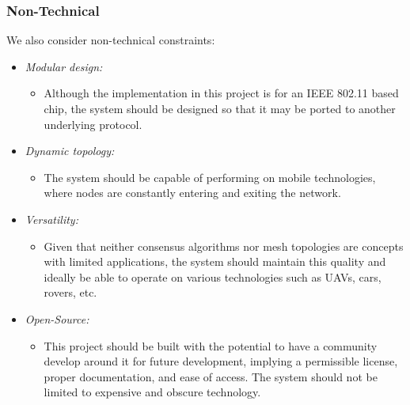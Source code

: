 \subsubsection{Non-Technical}

We also consider non-technical constraints:

\begin{itemize}
    \item \textit{Modular design:} 
    \begin{itemize}
        \item  Although the implementation in this project is for an IEEE 802.11 based chip, the system should be designed so that it may be ported to another underlying protocol.
    \end{itemize}
    
    
    \item \textit{Dynamic topology:}
    \begin{itemize}
        \item  The system should be capable of performing on mobile technologies, where nodes are constantly entering and exiting the network.
    \end{itemize}
    
    \item \textit{Versatility:}
    \begin{itemize}
        \item  Given that neither consensus algorithms nor mesh topologies are concepts with limited applications, the system should maintain this quality and ideally be able to operate on various technologies such as UAVs, cars, rovers, etc.
    \end{itemize}
    
    \item \textit{Open-Source:}
    \begin{itemize}
        \item  This project should be built with the potential to have a community develop around it for future development, implying a permissible license, proper documentation, and ease of access. The system should not be limited to expensive and obscure technology.
    \end{itemize}
\end{itemize}
 

